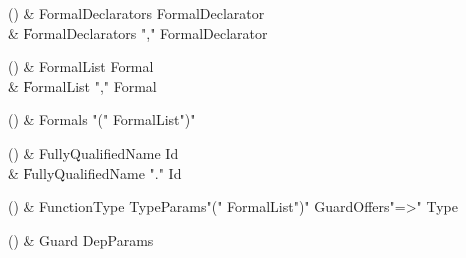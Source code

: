 \begin{bbgrammarappendix}

() & FormalDeclarators \label{prod:FormalDeclarators}  \: FormalDeclarator  \\

 &    \| FormalDeclarators \xcd"," FormalDeclarator \\

\end{bbgrammarappendix}

\begin{bbgrammarappendix}

() & FormalList \label{prod:FormalList}  \: Formal  \\

 &    \| FormalList \xcd"," Formal \\

\end{bbgrammarappendix}

\begin{bbgrammarappendix}

() & Formals \label{prod:Formals}  \: \xcd"(" FormalList\opt \xcd")"  \\


\end{bbgrammarappendix}

\begin{bbgrammarappendix}

() & FullyQualifiedName \label{prod:FullyQualifiedName}  \: Id  \\

 &    \| FullyQualifiedName \xcd"." Id \\

\end{bbgrammarappendix}

\begin{bbgrammarappendix}

() & FunctionType \label{prod:FunctionType}  \: TypeParams\opt \xcd"(" FormalList\opt \xcd")" Guard\opt Offers\opt \xcd"=>" Type  \\


\end{bbgrammarappendix}

\begin{bbgrammarappendix}

() & Guard \label{prod:Guard}  \: DepParams  \\


\end{bbgrammarappendix}

